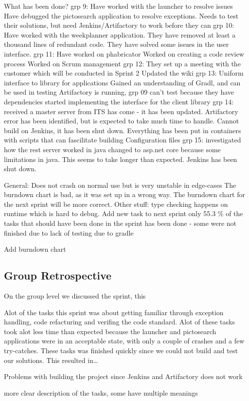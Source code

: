 What has been done?
grp 9:
Have worked with the launcher to resolve issues
Have debugged the pictosearch application to resolve exceptions.
Needs to test their solutions, but need Jenkins/Artifactory to work before they can
grp 10:
Have worked with the weekplanner application.
They have removed at least a thousand lines of redundant code.
They have solved some issues in the user interface.
grp 11:
Have worked on phabricator
Worked on creating a code review process
Worked on Scrum management
grp 12:
They set up a meeting with the customer which will be conducted in Sprint 2
Updated the wiki
grp 13:
Uniform interface to library for applications
Gained an understanding of Gradl, and can be used in testing
Artifactory is running, grp 09 can’t test because they have dependencies
started implementing the interface for the client library
grp 14:
received a master server from ITS has come - it has been updated.
Artifactory error has been identified, but is expected to take much time to handle.
Cannot build on Jenkins, it has been shut down.
Everything has been put in containers with scripts that can fascilitate building
Configuration files
grp 15:
investigated how the rest server worked in java
changed to asp.net core because some limitations in java. This seems to take longer than expected.
Jenkins has been shut down.

General:
Does not crash on normal use but is very unstable in edge-cases
The burndown chart is bad, as it was set up in a wrong way. The burndown chart for the next sprint will be more correct.
Other stuff:
type checking happens on runtime which is hard to debug.
Add new task to next sprint
only 55.3 \% of the tasks that should have been done in the sprint has been
done - some were not finished due to lack of testing due to gradle

Add burndown chart


\subsection{Group Retrospective}

On the group level we discussed the sprint, this 



Alot of the tasks this sprint was about getting familiar through exception
handling, code refacturing and verifing the code standard. Alot of these tasks
took alot less time than expected because the launcher and pictosearch
applications were in an acceptable state, with only a couple of crashes and a
few try-catches. These tasks was finished quickly since we could not build
and test our solutions. This resulted in\ldots 


Problems with building the project since Jenkins and Artifactory does not work

more clear description of the tasks, some have multiple meanings
